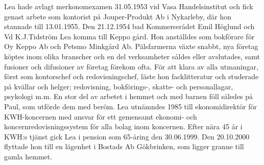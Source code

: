 Lea hade avlagt merkonomexamen 31.05.1953 vid Vasa Handelsinstitut och fick genast arbete som kontorist på Jouper-Produkt Ab i Nykarleby, där hon stannade till 13.01.1955. Den 21.12.1954 bad Kommerserådet Emil Höglund och Vd K.J.Tidström Lea komma till Keppo gård. Hon anställdes som bokförare för Oy Keppo Ab och Petsmo Minkgård Ab. Pälsfarmerna växte snabbt, nya företag köptes inom olika branscher och en del verksamheter såldes eller avslutades, samt fusioner och difusioner av företag förekom ofta. För att klara av alla utmaningar, först som kontorschef och redovisningschef, läste hon facklitteratur och studerade på kvällar och helger; redovisning, bokförings-, skatte- och personallagar, psykologi m.m. En stor del av arbetet i hemmet och med barnen föll således på Paul, som utförde dem med beröm. Lea utnämndes 1985 till ekonomidirektör för KWH-koncernen med ansvar för ett gemensamt ekonomi- och koncernredovisningssystem för alla bolag inom koncernen. Efter nära 45 år i KWH:s tjänst gick Lea i pension som 65-åring den 30.06.1999. Den 20.10.2000 flyttade hon till en lägenhet i Bostads Ab Gökbrinken, som ligger granne till gamla hemmet.


